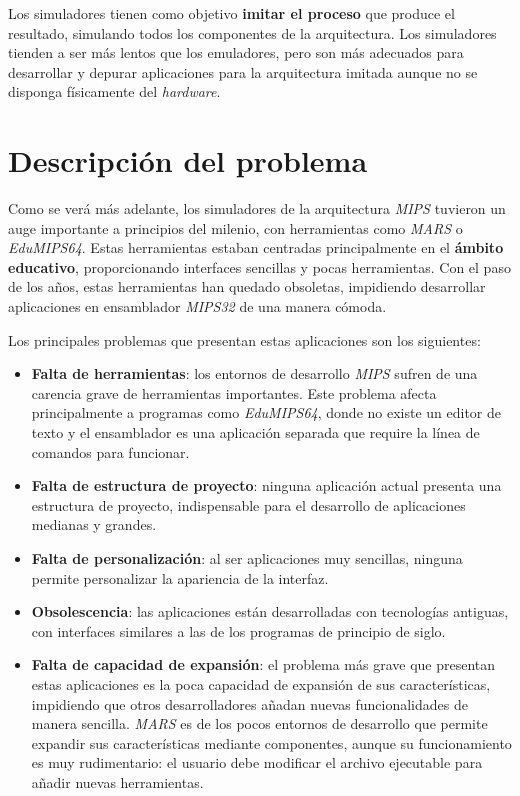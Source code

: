 Los simuladores tienen como objetivo \textbf{imitar el proceso}
que produce el resultado, simulando todos los componentes de la arquitectura.
Los simuladores tienden a ser más lentos que los emuladores, pero son más
adecuados para desarrollar y depurar aplicaciones para la arquitectura
imitada aunque no se disponga físicamente del \textit{hardware}.


\section{Descripción del problema}\label{sec:descripcion-del-problema}

Como se verá más adelante, los simuladores de la arquitectura \textit{MIPS} tuvieron
un auge importante a principios del milenio, con herramientas como \textit{MARS}\cite{MARS}
o \textit{EduMIPS64}\cite{EDUMIPS64}.
Estas herramientas estaban centradas principalmente en el \textbf{ámbito educativo}, proporcionando
interfaces sencillas y pocas herramientas.
Con el paso de los años, estas herramientas han quedado obsoletas, impidiendo desarrollar aplicaciones
en ensamblador \textit{MIPS32} de una manera cómoda.

Los principales problemas que presentan estas aplicaciones son los siguientes:
\begin{itemize}
    \item \textbf{Falta de herramientas}: los entornos de desarrollo \textit{MIPS} sufren de una
    carencia grave de herramientas importantes.
    Este problema afecta principalmente a programas como \textit{EduMIPS64}, donde no existe un editor de texto y
    el ensamblador es una aplicación separada que require la línea de comandos para funcionar.
    \item \textbf{Falta de estructura de proyecto}: ninguna aplicación actual presenta una estructura
    de proyecto, indispensable para el desarrollo de aplicaciones medianas y grandes.
    \item \textbf{Falta de personalización}: al ser aplicaciones muy sencillas, ninguna permite
    personalizar la apariencia de la interfaz.
    \item \textbf{Obsolescencia}: las aplicaciones están desarrolladas con tecnologías antiguas,
    con interfaces similares a las de los programas de principio de siglo.
    \item \textbf{Falta de capacidad de expansión}: el problema más grave que presentan estas aplicaciones
    es la poca capacidad de expansión de sus características, impidiendo que otros desarrolladores
    añadan nuevas funcionalidades de manera sencilla.
    \textit{MARS} es de los pocos entornos de desarrollo que permite expandir
    sus características mediante componentes,
    aunque su funcionamiento es muy rudimentario: el usuario debe modificar el archivo ejecutable
    para añadir nuevas herramientas.
\end{itemize}


